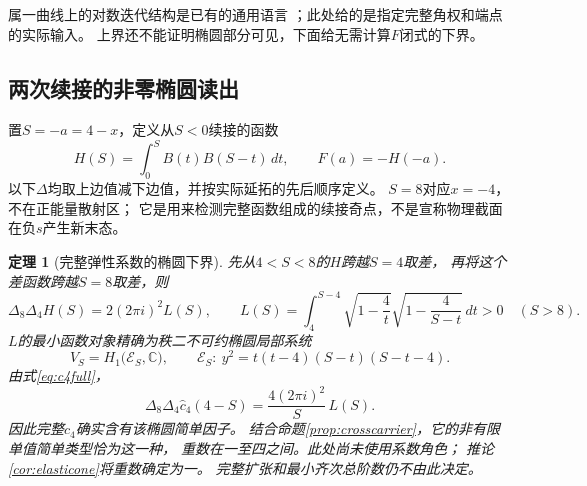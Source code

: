 \documentclass[11pt,a4paper]{ctexart}
\theoremstyle{cnplain}\newtheorem{theorem}{定理}[section]
\theoremstyle{definition}\newtheorem{definition}[theorem]{定义}
\theoremstyle{remark}\newtheorem{remark}[theorem]{注}
\begin{document}
属一曲线上的对数迭代结构是已有的通用语言
\cite{WeinEll}；此处给的是指定完整角权和端点的实际输入。
上界还不能证明椭圆部分可见，下面给无需计算$F$闭式的下界。

\subsection{两次续接的非零椭圆读出}
置$S=-a=4-x$，定义从$S<0$续接的函数
\[
 H(S)=\int_0^S B(t)B(S-t)\,dt,\qquad F(a)=-H(-a).
\]
以下$\Delta$均取上边值减下边值，并按实际延拓的先后顺序定义。
$S=8$对应$x=-4$，不在正能量散射区；
它是用来检测完整函数组成的续接奇点，不是宣称物理截面在负$s$产生新末态。

\begin{theorem}[完整弹性系数的椭圆下界]\label{thm:elasticelliptic}
先从$4<S<8$的$H$跨越$S=4$取差，
再将这个差函数跨越$S=8$取差，则
\begin{equation}\label{eq:doublecrossdisc}
 \Delta_8\Delta_4H(S)=2(2\pi i)^2L(S),\qquad
 L(S)=\int_4^{S-4}
       \sqrt{1-\frac4t}\sqrt{1-\frac4{S-t}}\,dt>0\quad(S>8).
\end{equation}
$L$的最小函数对象精确为秩二不可约椭圆局部系统
\[
 V_S=H_1\bigl(\mathcal E_S,\mathbb C\bigr),\qquad
 \mathcal E_S:\ y^2=t(t-4)(S-t)(S-t-4).
\]
由式\eqref{eq:c4full}，
\begin{equation}\label{eq:c4disc}
 \Delta_8\Delta_4\widehat c_4(4-S)
       =\frac{4(2\pi i)^2}{S}\,L(S).
\end{equation}
因此完整$c_4$确实含有该椭圆简单因子。
结合命题\ref{prop:crosscarrier}，它的非有限单值简单类型恰为这一种，
重数在一至四之间。此处尚未使用系数角色；
推论\ref{cor:elasticone}将重数确定为一。
完整扩张和最小齐次总阶数仍不由此决定。
\end{theorem}
\end{document}
